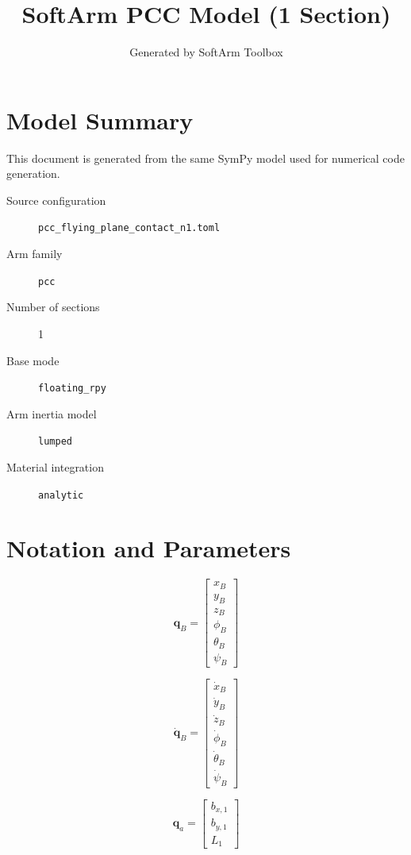 \documentclass[11pt]{article}
\title{SoftArm PCC Model (1 Section)}
\author{Generated by SoftArm Toolbox}
\date{}
\begin{document}
\maketitle

\section{Model Summary}
This document is generated from the same SymPy model used for numerical code generation.
\begin{description}
\item[Source configuration] \texttt{pcc\_flying\_plane\_contact\_n1.toml}
\item[Arm family] \texttt{pcc}
\item[Number of sections] 1
\item[Base mode] \texttt{floating\_rpy}
\item[Arm inertia model] \texttt{lumped}
\item[Material integration] \texttt{analytic}
\end{description}

\section{Notation and Parameters}
\begin{equation}
\boldsymbol q_B=\begin{bmatrix}x_B\\y_B\\z_B\\\phi_B\\\theta_B\\\psi_B\end{bmatrix}
\end{equation}

\begin{equation}
\dot{\boldsymbol q}_B=\begin{bmatrix}\dot{x}_B\\\dot{y}_B\\\dot{z}_B\\\dot{\phi}_B\\\dot{\theta}_B\\\dot{\psi}_B\end{bmatrix}
\end{equation}

\begin{equation}
\boldsymbol q_a=\begin{bmatrix}b_{x,1}\\b_{y,1}\\L_{1}\end{bmatrix}
\end{equation}
\end{document}

